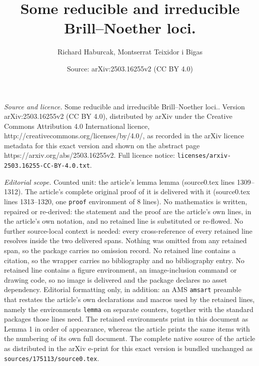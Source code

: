 \documentclass[10pt,a4paper]{amsart}
\title{Some reducible and irreducible Brill--Noether loci.}
\author{Richard Haburcak, Montserrat Teixidor i Bigas}
\date{Source: arXiv:2503.16255v2 (CC BY 4.0)}
\newtheorem{lemma}{Lemma}
\begin{document}
\maketitle

\noindent\emph{Source and licence.} Some reducible and irreducible Brill--Noether loci.. Version arXiv:2503.16255v2 (CC BY 4.0), distributed by arXiv under the Creative Commons Attribution 4.0 International licence, http://creativecommons.org/licenses/by/4.0/, as recorded in the arXiv licence metadata for this exact version and shown on the abstract page https://arxiv.org/abs/2503.16255v2. Full licence notice: \texttt{licenses/arxiv-2503.16255-CC-BY-4.0.txt}.\par\smallskip

\noindent\textit{Editorial scope.} Counted unit: the article's lemma lemma (source0.tex lines 1309--1312). The article's complete original proof of it is delivered with it (source0.tex lines 1313--1320, one \texttt{proof} environment of 8 lines). No mathematics is written, repaired or re-derived: the statement and the proof are the article's own lines, in the article's own notation, and no retained line is substituted or re-flowed.  No further source-local context is needed: every cross-reference of every retained line resolves inside the two delivered spans.  Nothing was omitted from any retained span, so the package carries no omission record.  No retained line contains a citation, so the wrapper carries no bibliography and no bibliography entry.  No retained line contains a figure environment, an image-inclusion command or drawing code, so no image is delivered and the package declares no asset dependency.  Editorial formatting only, in addition: an AMS \texttt{amsart} preamble that restates the article's own declarations and macros used by the retained lines, namely the environments \texttt{lemma} on separate counters, together with the standard packages those lines need.  The retained environments print in this document as Lemma 1 in order of appearance, whereas the article prints the same items with the numbering of its own full document.  The complete native source of the article as distributed in the arXiv e-print for this exact version is bundled unchanged as \texttt{sources/175113/source0.tex}.
\end{document}
